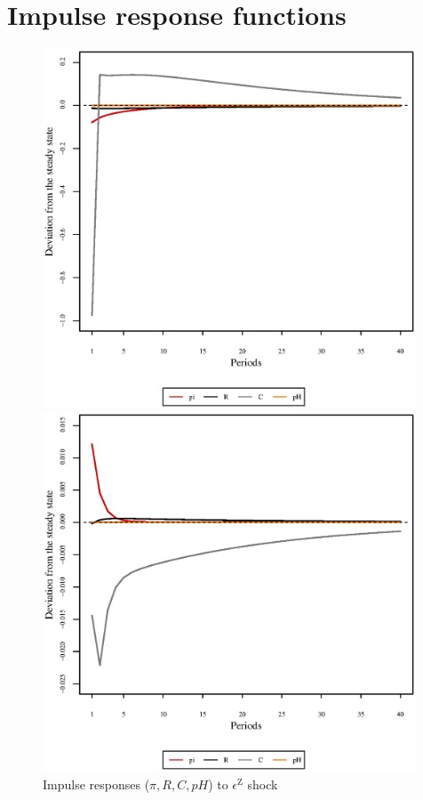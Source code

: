 \pagebreak

\section{Impulse response functions}

\begin{figure}[h]
\begin{minipage}{0.5\textwidth}
\vspace*{-3em}
\centering
\includegraphics[width=0.99\textwidth, scale=0.55]{plots/plot_21.eps}
\caption{Impulse responses ($\pi, R, C, {p\!H}$) to $\epsilon^{\mathrm{Z}}$ shock}
\end{minipage}
\begin{minipage}{0.5\textwidth}
\vspace*{-3em}
\centering
\includegraphics[width=0.99\textwidth, scale=0.55]{plots/plot_22.eps}

\end{minipage}
\end{figure}
